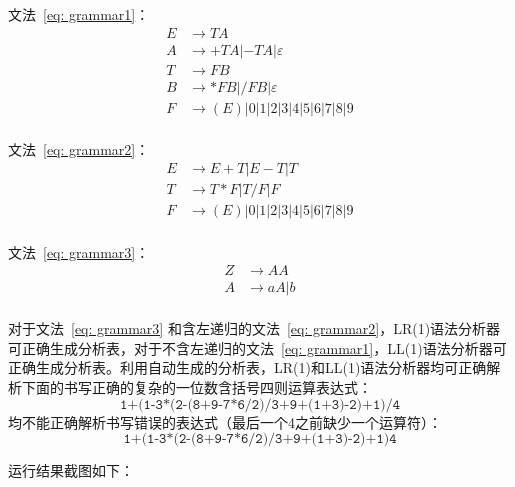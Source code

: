 \documentclass{article}
\begin{document}
\begin{CJK*}{UTF8}{gbsn}
文法~\ref{eq: grammar1}：
\begin{equation}
\begin{aligned} \label{eq: grammar1}
E &\rightarrow TA \\
A &\rightarrow +TA|-TA|\varepsilon \\
T &\rightarrow FB \\
B &\rightarrow *FB|/FB|\varepsilon \\
F &\rightarrow (E)|0|1|2|3|4|5|6|7|8|9 \\
\end{aligned}
\end{equation}

文法~\ref{eq: grammar2}：
\begin{equation} \label{eq: grammar2}
\begin{aligned}
E &\rightarrow E+T|E-T|T \\
T &\rightarrow T*F|T/F|F \\
F &\rightarrow (E)|0|1|2|3|4|5|6|7|8|9 \\
\end{aligned}
\end{equation}

文法~\ref{eq: grammar3}：
\begin{equation} \label{eq: grammar3}
\begin{aligned}
Z &\rightarrow AA \\
A &\rightarrow aA|b \\
\end{aligned}
\end{equation}

对于文法~\ref{eq: grammar3} 和含左递归的文法~\ref{eq: grammar2}，LR(1)语法分析器可正确生成分析表，对于不含左递归的文法~\ref{eq: grammar1}，LL(1)语法分析器可正确生成分析表。利用自动生成的分析表，LR(1)和LL(1)语法分析器均可正确解析下面的书写正确的复杂的一位数含括号四则运算表达式：
\[ \texttt{1+(1-3*(2-(8+9-7*6/2)/3+9+(1+3)-2)+1)/4} \]
均不能正确解析书写错误的表达式（最后一个4之前缺少一个运算符）：
\[ \texttt{1+(1-3*(2-(8+9-7*6/2)/3+9+(1+3)-2)+1)4} \]

运行结果截图如下：


\end{CJK*}
\end{document}
